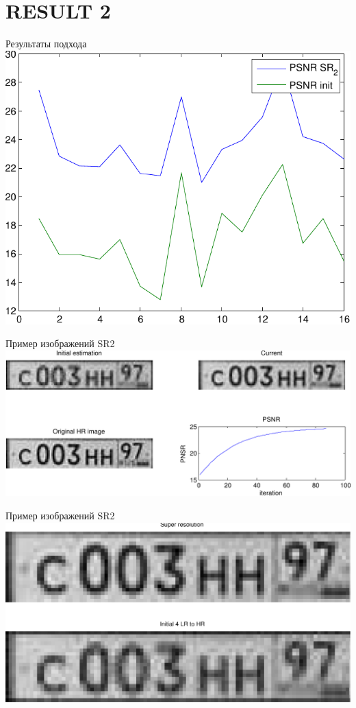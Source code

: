 \section{RESULT 2}
\begin{frame}{Результаты подхода}
  \includegraphics[width=\columnwidth]{content/compare_result_sr2.pdf}
\end{frame}
\begin{frame}{Пример изображений SR2}
  \includegraphics[width=\columnwidth]{content/sr2_result_img.pdf}
\end{frame}

\begin{frame}{Пример изображений SR2}
  \includegraphics[width=\columnwidth]{content/sr2_two_images.pdf}
\end{frame}

